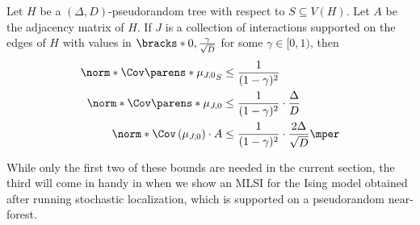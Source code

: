 \documentclass[11pt,letterpaper]{article}
\begin{document}
    \begin{lemma} \label{lem:tree-cov}
        Let $H$ be a $(\Delta,D)$-pseudorandom tree with respect to $S\subseteq V(H)$. Let $A$ be the adjacency matrix of $H$.
        If $J$ is a collection of interactions supported on the edges of $H$ with values in $\bracks*{0, \frac{\gamma}{\sqrt{D}}}$ for some $\gamma \in [0,1)$, then
        \begin{align*}
            \norm*{\Cov\parens*{\mu_{J,0}}_S} &\le \frac{1}{(1-\gamma)^2} \\
            \norm*{\Cov\parens*{\mu_{J,0}}} &\le \frac{1}{(1-\gamma)^2}\cdot\frac{\Delta}{D} \\
            \norm*{\Cov\left(\mu_{J,0}\right) \cdot A} &\le \frac{1}{(1-\gamma)^2} \cdot \frac{2\Delta}{\sqrt{D}} \mper
        \end{align*}
    \end{lemma}
    While only the first two of these bounds are needed in the current section, the third will come in handy in  when we show an MLSI for the Ising model obtained after running stochastic localization, which is supported on a pseudorandom near-forest.
\end{document}
